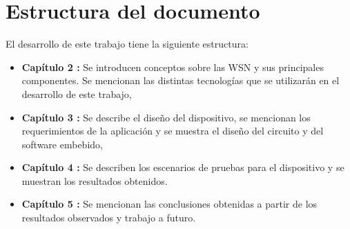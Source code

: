 \section{Estructura del documento}

El desarrollo de este trabajo tiene la siguiente estructura: 

\begin{itemize}
	\item \textbf{Capítulo 2 :} Se introducen conceptos sobre las WSN y sus principales componentes. Se mencionan las distintas tecnologías que se utilizarán en el desarrollo de este trabajo,
	\item \textbf{Capítulo 3 :} Se describe el diseño del dispositivo, se mencionan los requerimientos de la aplicación y se muestra el diseño del circuito y del software embebido,
	\item \textbf{Capítulo 4 :} Se describen los escenarios de pruebas para el dispositivo y se muestran los resultados obtenidos. 
	\item \textbf{Capítulo 5 :} Se mencionan las conclusiones obtenidas a partir de los resultados observados y trabajo a futuro. 
\end{itemize}